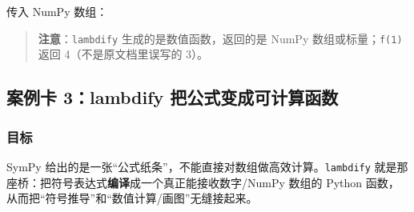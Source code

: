 \begin{Shaded}
\begin{Highlighting}[]
\end{Highlighting}
\end{Shaded}

传入 NumPy 数组：

\begin{Shaded}
\begin{Highlighting}[]
\OperatorTok{=}\NormalTok{)}
\OperatorTok{=}\OperatorTok{**}\NormalTok{, }\NormalTok{)}
\NormalTok{(f(np.array([}\OperatorTok{/}\NormalTok{, np.pi])))}
\end{Highlighting}
\end{Shaded}

\begin{Shaded}
\begin{Highlighting}[]
\NormalTok{[0.00000000e+00 1.00000000e+00 1.49975978e{-}32]}
\end{Highlighting}
\end{Shaded}

\begin{quote}
\textbf{注意}：\texttt{lambdify} 生成的是数值函数，返回的是 NumPy
数组或标量；\texttt{f(1)} 返回 4（不是原文档里误写的 3）。
\end{quote}

\subsection{案例卡 3：lambdify
把公式变成可计算函数}\label{ux6848ux4f8bux5361-3lambdify-ux628aux516cux5f0fux53d8ux6210ux53efux8ba1ux7b97ux51fdux6570}

\subsubsection{目标}\label{ux76eeux6807-13}

SymPy
给出的是一张``公式纸条''，不能直接对数组做高效计算。\texttt{lambdify}
就是那座桥：把符号表达式\textbf{编译}成一个真正能接收数字/NumPy 数组的
Python 函数，从而把``符号推导''和``数值计算/画图''无缝接起来。

